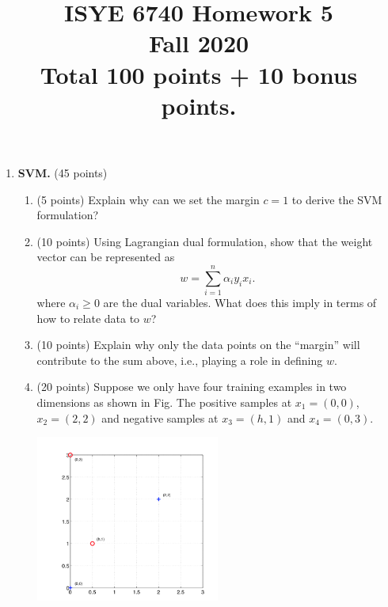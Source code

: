 \documentclass[twoside,10pt]{article}
\begin{document}
\title{ISYE 6740 Homework 5\\ 
Fall 2020\\
\small Total 100 points + 10 bonus points.}
\date{}
\maketitle







\begin{enumerate}


\item{\bf SVM. } (45 points)

\begin{enumerate}
\item (5 points) Explain why can we set the margin $c = 1$ to derive the SVM formulation?
\item (10 points) Using Lagrangian dual formulation, show that the weight vector can be represented as
\[
w = \sum_{i=1}^n \alpha_i y_i x_i.
\]
where $\alpha_i \geq 0$ are the dual variables. What does this imply in terms of how to relate data to $w$?
\item (10 points) Explain why only the data points on the ``margin'' will contribute to the sum above, i.e., playing a role in defining $w$. 

\item (20 points) Suppose we only have four training examples in two dimensions as shown in Fig. The positive samples at $x_1 = (0, 0)$, $x_2 = (2, 2)$ and negative samples at $x_3 = (h, 1)$ and $x_4 = (0, 3)$. 
%
\begin{center}
\includegraphics[width = 0.5\textwidth]{images/svm}
\end{center}


\end{enumerate}
\end{enumerate}
\end{document}
